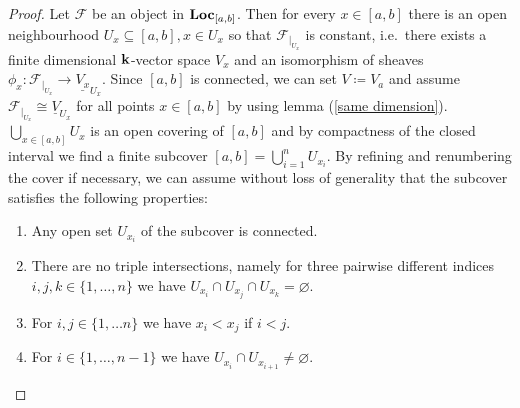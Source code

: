 \begin{proof}
    Let $\mathcal{F}$ be an object in $\mathbf{Loc}_{[a,b]}$. Then for every $x \in [a,b]$ there is an open neighbourhood $U_x\subseteq [a,b], x \in U_x$ so that $\mathcal{F}_{\vert_{U_x}}$ is constant, i.e.\ there exists a finite dimensional $\mathbf{k}$-vector space $V_x$ and an isomorphism of sheaves $\phi_x: \mathcal{F}_{\vert_{U_x}} \to \underline{V_x}_{U_x}$. Since $[a,b]$ is connected, we can set $V \coloneqq V_a$ and assume $\mathcal{F}_{\vert_{U_x}} \cong \underline{V}_{U_x}$ for all points $x \in [a,b]$ by using lemma (\ref{same dimension}).
    $\bigcup_{x \in [a,b]} U_x$ is an open covering of $[a,b]$ and by compactness of the closed interval we find a finite subcover $[a,b]=\bigcup_{i=1}^n U_{x_i}$. By refining and renumbering the cover if necessary, we can assume without loss of generality that the subcover satisfies the following properties:
    \begin{enumerate}
        \item Any open set $U_{x_i}$ of the subcover is connected.
        \item There are no triple intersections, namely for three pairwise different indices $i,j,k \in \{1, \dots, n\}$ we have $U_{x_i}\cap U_{x_j} \cap U_{x_k} = \varnothing$.
        \item For $i, j \in \{1, \dots n\}$ we have $x_i < x_j$ if $i < j$.
        \item For $i \in \{1, \dots, n-1\}$ we have $U_{x_i} \cap U_{x_{i+1}} \neq \varnothing$.
    \end{enumerate}

\begin{figure}[h!]
    \centering    
\end{figure}
\end{proof}

